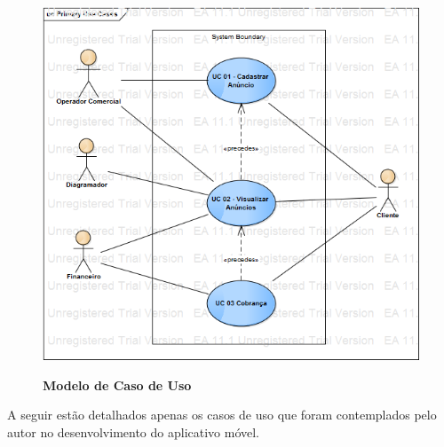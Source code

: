 \documentclass[
	12pt,				%
	openright,			%
	oneside,			%
	a4paper,			%
	chapter=TITLE,		%
	section=TITLE,		%
	english,			%
	french,				%
	spanish,			%
	brazil				%
	]{abntex2}
\begin{document}
\begin{figure}[htb]
	\begin{center}
		\caption{
			\textbf{Modelo de Caso de Uso}
		}\label{fig-modelo-uc}
		\includegraphics [scale=0.5]{imagens/modelo_caso_de_uso.png}
		\label{fig-modelo-uc}
	\end{center}
\end{figure}

A seguir estão detalhados apenas os casos de uso que foram contemplados pelo autor no desenvolvimento do aplicativo móvel.
\end{document}
